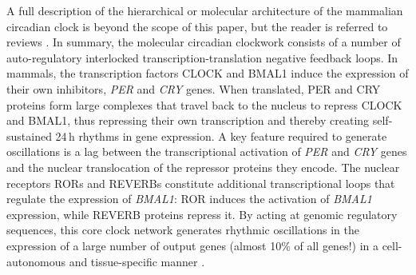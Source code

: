 A full description of the hierarchical or molecular architecture of the mammalian circadian clock is beyond the scope of this paper, but the reader is referred to reviews \cite{Takahashi2017, Dibner2010}. In summary, the molecular circadian clockwork consists of a number of auto-regulatory interlocked transcription-translation negative feedback loops. In mammals, the transcription factors CLOCK and BMAL1 induce the expression of their own inhibitors, \textit{PER} and \textit{CRY} genes. When translated, PER and CRY proteins form large complexes that travel back to the nucleus to repress CLOCK and BMAL1, thus repressing their own transcription and thereby creating self-sustained 24\,h rhythms in gene expression. A key feature required to generate oscillations is a lag between the transcriptional activation of \textit{PER} and \textit{CRY} genes and the nuclear translocation of the repressor proteins they encode. The nuclear receptors RORs and REVERBs constitute additional transcriptional loops that regulate the expression of \textit{BMAL1}: ROR induces the activation of \textit{BMAL1 }expression, while REVERB proteins repress it. By acting at genomic regulatory sequences, this core clock network generates rhythmic oscillations in the expression of a large number of output genes (almost 10\% of all genes!) in a cell-autonomous and tissue-specific manner \cite{Akhtar2002, Duffield2002, Miller2007, Panda2002, Keller2009, Storch2002, Mohawk2012}. \\

